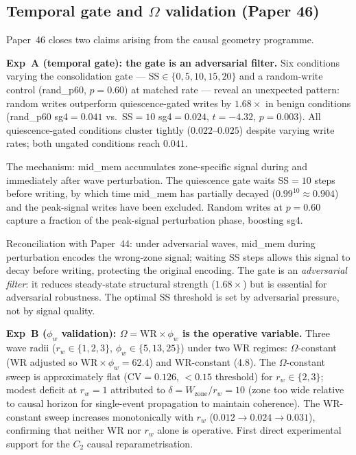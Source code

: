 \documentclass[11pt]{article}
\begin{document}
\subsection{Temporal gate and $\Omega$ validation (Paper 46)}

Paper~46 closes two claims arising from the causal geometry programme.

\textbf{Exp~A (temporal gate): the gate is an adversarial filter.}
Six conditions varying the consolidation gate --- SS$\in\{0,5,10,15,20\}$ and a
random-write control (rand\_p60, $p=0.60$) at matched rate --- reveal an unexpected pattern:
random writes outperform quiescence-gated writes by $1.68\times$ in benign conditions
(rand\_p60 sg4$=0.041$ vs.\ SS$=10$ sg4$=0.024$, $t=-4.32$, $p=0.003$).
All quiescence-gated conditions cluster tightly ($0.022$--$0.025$) despite varying
write rates; both ungated conditions reach $0.041$.

The mechanism: mid\_mem accumulates zone-specific signal during and immediately after
wave perturbation.
The quiescence gate waits SS$=10$ steps before writing, by which time mid\_mem has
partially decayed ($0.99^{10} \approx 0.904$) and the peak-signal writes have been excluded.
Random writes at $p=0.60$ capture a fraction of the peak-signal perturbation phase, boosting sg4.

Reconciliation with Paper~44: under adversarial waves, mid\_mem during perturbation encodes
the wrong-zone signal; waiting SS steps allows this signal to decay before writing,
protecting the original encoding.
The gate is an \emph{adversarial filter}: it reduces steady-state structural strength
($1.68\times$) but is essential for adversarial robustness.
The optimal SS threshold is set by adversarial pressure, not by signal quality.

\textbf{Exp~B ($\phi_w$ validation): $\Omega = \mathrm{WR}\times\phi_w$ is the operative variable.}
Three wave radii ($r_w \in \{1,2,3\}$, $\phi_w \in \{5,13,25\}$) under two WR regimes:
$\Omega$-constant (WR adjusted so $\mathrm{WR}\times\phi_w=62.4$) and WR-constant (4.8).
The $\Omega$-constant sweep is approximately flat (CV$=0.126$, $<0.15$ threshold)
for $r_w \in \{2,3\}$; modest deficit at $r_w=1$ attributed to $\delta = W_\mathrm{zone}/r_w = 10$
(zone too wide relative to causal horizon for single-event propagation to maintain coherence).
The WR-constant sweep increases monotonically with $r_w$ ($0.012 \to 0.024 \to 0.031$),
confirming that neither WR nor $r_w$ alone is operative.
First direct experimental support for the $C_2$ causal reparametrisation.
\end{document}
